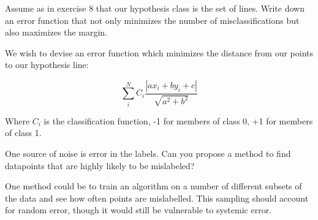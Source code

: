 \documentclass{hw}
\begin{document}
    Assume as in exercise 8 that our hypothesis class is the set of lines. Write down an error function that not only minimizes the number of misclassifications but also maximizes the margin.

\solution
    We wish to devise an error function which minimizes the distance from our points to our hypothesis line:

    $$ \sum_i^N C_i \frac{\left| a x_i + b y_i +c \right|}{\sqrt{a^2 + b^2}} $$

    Where $C_i$ is the classification function, -1 for members of class 0, +1 for members of class 1.
    

    One source of noise is error in the labels. Can you propose a method to find datapoints that are highly likely to be mislabeled?

\solution
    One method could be to train an algorithm on a number of different subsets of the data and see how often points are mislabelled. This sampling should account for random error, though it would still be vulnerable to systemic error.
\end{document}
